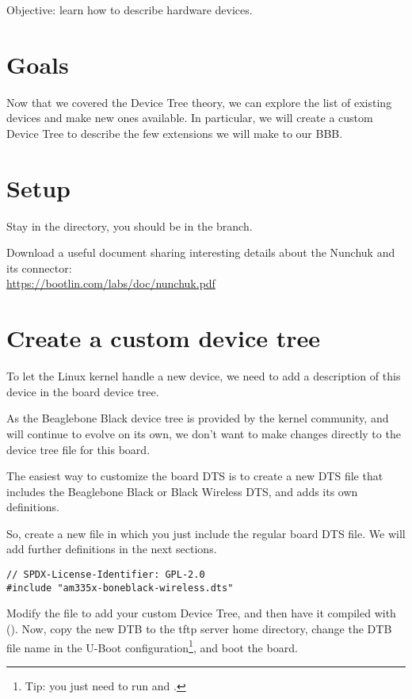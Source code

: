 {Objective: learn how to describe hardware devices.}

\section{Goals}

Now that we covered the Device Tree theory, we can explore the list of
existing devices and make new ones available. In particular, we will
create a custom Device Tree to describe the few extensions we will make
to our BBB.

\section{Setup}

Stay in the  directory, you should be in
the  branch.

Download a useful document sharing interesting details about the Nunchuk
and its connector:\\
\url{https://bootlin.com/labs/doc/nunchuk.pdf}

\section{Create a custom device tree}

To let the Linux kernel handle a new device, we need to add a
description of this device in the board device tree.

As the Beaglebone Black device tree is provided by the kernel community,
and will continue to evolve on its own, we don't want to make changes
directly to the device tree file for this board.

The easiest way to customize the board DTS is to create a new DTS file
that includes the Beaglebone Black or Black Wireless DTS, and adds
its own definitions.

So, create a new
 file in which
you just include the regular board DTS file. We will add further
definitions in the next sections.

\begin{verbatim}
// SPDX-License-Identifier: GPL-2.0
#include "am335x-boneblack-wireless.dts"
\end{verbatim}

Modify the  file to add your custom
Device Tree, and then have it compiled with (). Now,
copy the new DTB to the tftp server home directory, change the DTB file
name in the U-Boot configuration\footnote{Tip: you just need to run
 and .}, and boot the board.

